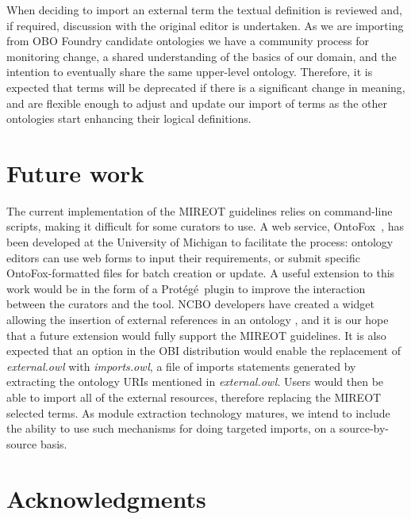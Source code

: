 \documentclass[jou]{ao2e}%
\newcommand{\protege}{Prot\'{e}g\'{e}}
\begin{document}
When deciding to import an external term the textual definition is reviewed and, if required, discussion with the original editor is undertaken.
As we are importing from \ac{OBO} Foundry candidate ontologies we have a community process for monitoring change, a shared understanding of the basics of our domain, and the intention to eventually share the same upper-level ontology. 
Therefore, it is expected that terms will be deprecated if there is a significant change in meaning, and are flexible enough to adjust and update our import of terms as the other ontologies start enhancing their logical definitions.

\section*{Future work}
The current implementation of the \ac{MIREOT} guidelines relies on command-line scripts, making it difficult for some curators to use. 
A web service, OntoFox~\citep{OntoFox}, has been developed at the University of Michigan to facilitate the process: ontology editors can use web forms to input their requirements, or submit specific OntoFox-formatted files for batch creation or update.
A useful extension to this work would be in the form of a \protege\  plugin to improve the interaction between the curators and the tool. NCBO developers have created a widget allowing the insertion of external references in an ontology%
, and it is our hope that a future extension would fully support the MIREOT guidelines.
It is also expected that an option in the \ac{OBI} distribution would enable the replacement of \emph{external.owl} with \emph{imports.owl}, a file of imports statements generated by extracting the ontology URIs mentioned in \emph{external.owl}. Users would then be able to import all of the external resources, therefore replacing the MIREOT selected terms.  As module extraction technology matures, we intend to include the ability to use such mechanisms for doing targeted imports, on a source-by-source basis.%



\section*{Acknowledgments}
\end{document}
